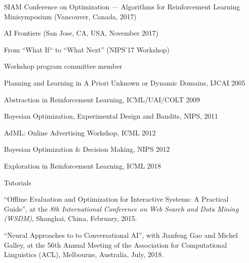 \documentclass[10pt,twoside,letterpaper]{article}
\newcommand{\venuefont}[1]{{\textit{#1}}}
\newcommand{\negitemspace}{\vspace{1mm}}
\begin{document}
\begin{compactitem}
\begin{compactitem}
\begin{compactitem}
\item{SIAM Conference on Optimization --- Algorithms for Reinforcement Learning Minisymposium (Vancouver, Canada, 2017)}

\item{AI Frontiers (San Jose, CA, USA, November 2017)}

\item{From “What If“ to “What Next” (NIPS’17 Workshop)}

\end{compactitem}

\item{Workshop program committee member}

\begin{compactitem}

\item{Planning and Learning in A Priori Unknown or Dynamic Domains, IJCAI 2005}

\item{Abstraction in Reinforcement Learning, ICML/UAI/COLT 2009}

\item{Bayesian Optimization, Experimental Design and Bandits, NIPS, 2011}

\item{AdML: Online Advertising Workshop, ICML 2012}

\item{Bayesian Optimization \& Decision Making, NIPS 2012}

\item{Exploration in Reinforcement Learning, ICML 2018}

\end{compactitem}

\end{compactitem} \negitemspace

\item{Tutorials} \negitemspace

\begin{compactitem}

\item{``Offline Evaluation and Optimization for Interactive Systems: A Practical Guide'', at the \venuefont{8th International Conference on Web Search and Data Mining (WSDM)}, Shanghai, China, February, 2015.}

\item{``Neural Approaches to to Conversational AI'', with Jianfeng Gao and Michel Galley, at the 56th
Annual Meeting of the Association for Computational Linguistics (ACL), Melbourne, Australia, July, 2018.}


\end{compactitem}
\end{compactitem}
\end{document}
